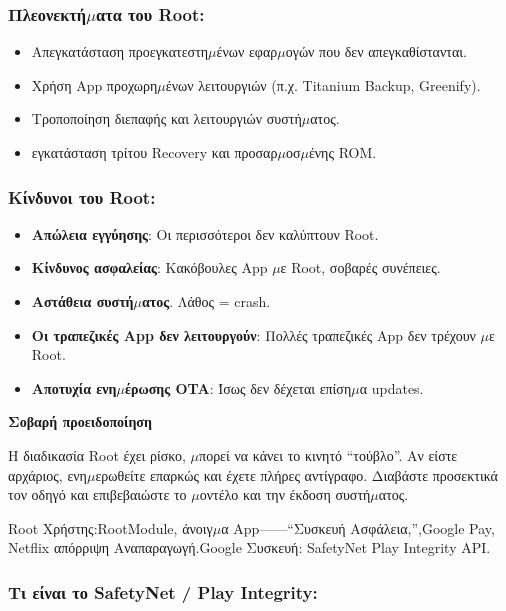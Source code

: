 \subsubsection*{Πλεονεκτή$\mu$ατα του Root:}

\begin{itemize}
  \item Απεγκατάσταση προεγκατεστη$\mu$ένων εφαρ$\mu$ογών που δεν απεγκαθίστανται.
  \item Χρήση App προχωρη$\mu$ένων λειτουργιών (π.χ. Titanium Backup, Greenify).
  \item Τροποποίηση διεπαφής και λειτουργιών συστή$\mu$ατος.
  \item εγκατάσταση τρίτου Recovery και προσαρ$\mu$οσ$\mu$ένης ROM.
\end{itemize}

\subsubsection*{Κίνδυνοι του Root:}

\begin{itemize}
  \item \textbf{Απώλεια εγγύησης}: Οι περισσότεροι δεν καλύπτουν Root.
  \item \textbf{Κίνδυνος ασφαλείας}: Κακόβουλες App $\mu$ε Root, σοβαρές συνέπειες.
  \item \textbf{Αστάθεια συστή$\mu$ατος}. Λάθος = crash.
  \item \textbf{Οι τραπεζικές App δεν λειτουργούν}: Πολλές τραπεζικές App δεν τρέχουν $\mu$ε Root.
  \item \textbf{Αποτυχία ενη$\mu$έρωσης OTA}: Ίσως δεν δέχεται επίση$\mu$α updates.
\end{itemize}

\textbf{Σοβαρή προειδοποίηση}\par

Η διαδικασία Root έχει ρίσκο, $\mu$πορεί να κάνει το κινητό “τούβλο”. Αν είστε αρχάριος, ενη$\mu$ερωθείτε επαρκώς και έχετε πλήρες αντίγραφο. Διαβάστε προσεκτικά τον οδηγό και επιβεβαιώστε το $\mu$οντέλο και την έκδοση συστή$\mu$ατος.


Root Χρήστης:RootModule, άνοιγ$\mu$α App——“Συσκευή Ασφάλεια,”,Google Pay, Netflix απόρριψη Αναπαραγωγή.Google Συσκευή: SafetyNet Play Integrity API.

\subsubsection*{Τι είναι το SafetyNet / Play Integrity:}

